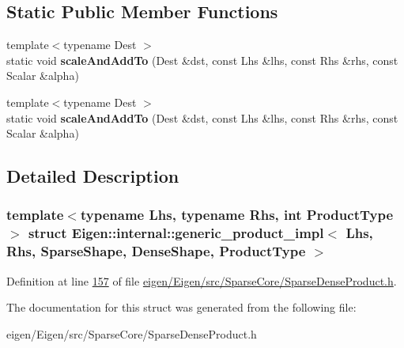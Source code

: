 \subsection*{Static Public Member Functions}
\begin{DoxyCompactItemize}
\item 
\mbox{\label{struct_eigen_1_1internal_1_1generic__product__impl_3_01_lhs_00_01_rhs_00_01_sparse_shape_00_01_d233f0596d1aaf62fecbcef5d636a2696_a2c535111950b4c372c510a00c7851775}} 
{\footnotesize template$<$typename Dest $>$ }\\static void {\bfseries scale\+And\+Add\+To} (Dest \&dst, const Lhs \&lhs, const Rhs \&rhs, const Scalar \&alpha)
\item 
\mbox{\label{struct_eigen_1_1internal_1_1generic__product__impl_3_01_lhs_00_01_rhs_00_01_sparse_shape_00_01_d233f0596d1aaf62fecbcef5d636a2696_a2c535111950b4c372c510a00c7851775}} 
{\footnotesize template$<$typename Dest $>$ }\\static void {\bfseries scale\+And\+Add\+To} (Dest \&dst, const Lhs \&lhs, const Rhs \&rhs, const Scalar \&alpha)
\end{DoxyCompactItemize}


\subsection{Detailed Description}
\subsubsection*{template$<$typename Lhs, typename Rhs, int Product\+Type$>$\newline
struct Eigen\+::internal\+::generic\+\_\+product\+\_\+impl$<$ Lhs, Rhs, Sparse\+Shape, Dense\+Shape, Product\+Type $>$}



Definition at line \hyperlink{eigen_2_eigen_2src_2_sparse_core_2_sparse_dense_product_8h_source_l00157}{157} of file \hyperlink{eigen_2_eigen_2src_2_sparse_core_2_sparse_dense_product_8h_source}{eigen/\+Eigen/src/\+Sparse\+Core/\+Sparse\+Dense\+Product.\+h}.



The documentation for this struct was generated from the following file\+:\begin{DoxyCompactItemize}
\item 
eigen/\+Eigen/src/\+Sparse\+Core/\+Sparse\+Dense\+Product.\+h\end{DoxyCompactItemize}
